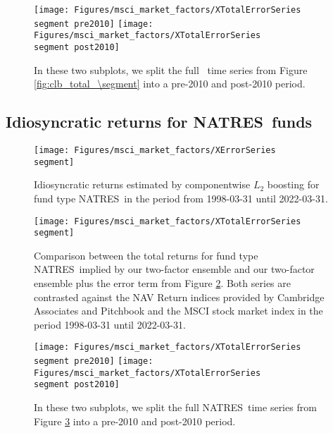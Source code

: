 \begin{figure}[H]
	\centering
	\texttt{[image: Figures/msci\_market\_factors/XTotalErrorSeries\\segment pre2010]}
	\texttt{[image: Figures/msci\_market\_factors/XTotalErrorSeries\\segment post2010]}
	\caption{
		In these two subplots, we split the full \segment \ time series from Figure \ref{fig:clb_total_\segment} into a pre-2010 and post-2010 period.
	}
	\label{fig:clb_pre_post_2010_\segment}
\end{figure}


\renewcommand{\segment}{NATRES}

\subsection{Idiosyncratic returns for \segment \ funds}
\label{sec:errors_\segment}

\begin{figure}[H]
	\centering
	\texttt{[image: Figures/msci\_market\_factors/XErrorSeries\\segment]}
	\caption{Idiosyncratic returns estimated by componentwise $L_2$ boosting for fund type \segment \ in the period from 1998-03-31 until 2022-03-31.}
	\label{fig:clb_idio_\segment}
\end{figure}

\begin{figure}[H]
	\centering
	\texttt{[image: Figures/msci\_market\_factors/XTotalErrorSeries\\segment]}
	\caption{
		Comparison between the total returns for fund type \segment \ implied by our two-factor ensemble and our two-factor ensemble plus the error term from Figure \ref{fig:clb_idio_\segment}.
		Both series are contrasted against the NAV Return indices provided by Cambridge Associates and Pitchbook and the MSCI stock market index in the period 1998-03-31 until 2022-03-31.
	}
	\label{fig:clb_total_\segment}
\end{figure}

\begin{figure}[H]
	\centering
	\texttt{[image: Figures/msci\_market\_factors/XTotalErrorSeries\\segment pre2010]}
	\texttt{[image: Figures/msci\_market\_factors/XTotalErrorSeries\\segment post2010]}
	\caption{
		In these two subplots, we split the full \segment \ time series from Figure \ref{fig:clb_total_\segment} into a pre-2010 and post-2010 period.
	}
	\label{fig:clb_pre_post_2010_\segment}
\end{figure}


\renewcommand{\segment}{MEZZ}

